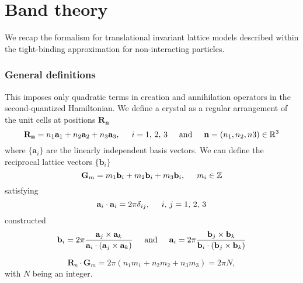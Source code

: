 \chapter{Band theory}
\label{ch:appendixA}
We recap the formalism for translational invariant lattice models described within the tight-binding approximation for non-interacting particles.
\subsection{General definitions}
This imposes only quadratic terms in creation and annihilation operators in the second-quantized Hamiltonian. We define a crystal as a regular arrangement of the unit cells at positions $\mathbf{R_n}$
\begin{equation}
\mathbf{R_n} = n_1  \mathbf{a}_1 + n_2  \mathbf{a}_2 + n_3  \mathbf{a}_3, \hspace*{0.5cm}  i = 1, \, 2, \, 3 \hspace*{0.5cm}  \textnormal{and} \hspace*{0.5cm} \mathbf{n} = (n_1, n_2, n3)  \in \mathbb{R}^3
\end{equation}
where $\lbrace \mathbf{a}_i \rbrace$ are the linearly independent basis vectors. We can define the reciprocal lattice vectors $\lbrace \mathbf{b}_i \rbrace$
\begin{equation}
\mathbf{G}_m = m_1 \mathbf{b}_i + m_2 \mathbf{b}_i + m_3 \mathbf{b}_i, \hspace*{0.5cm} m_i \in \mathbb{Z}
\end{equation}
satisfying
\begin{equation}
\mathbf{a}_i \cdot \mathbf{a}_i = 2 \pi \delta_{ij}, \hspace*{0.5cm} i, \, j = 1, \, 2, \, 3
\end{equation}
constructed
\begin{equation}
\mathbf{b}_i  = 2 \pi \frac{\mathbf{a}_j  \times \mathbf{a}_k }{\mathbf{a}_i  \cdot \left(\mathbf{a}_j  \times \mathbf{a}_k  \right)} \hspace*{0.5cm} \textnormal{and} \hspace*{0.5cm} \mathbf{a}_i = 2 \pi \frac{\mathbf{b}_j  \times \mathbf{b}_k }{\mathbf{b}_i  \cdot \left( \mathbf{b}_j \times \mathbf{b}_k  \right)}
\end{equation}



\begin{equation}
\mathbf{R}_n \cdot \mathbf{G}_m = 2 \pi \left( n_1 m_1 + n_2 m_2 + n_3 m_3 \right) = 2 \pi N,
\end{equation}
with $N$ being an integer.

